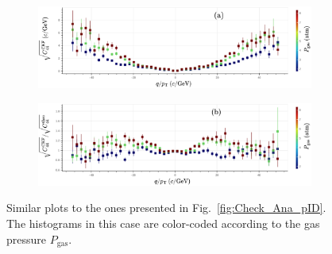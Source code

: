\begin{figure}[!ht]
     \centering
     \begin{subfigure}[b]{0.99\textwidth}
         \centering
         \includegraphics[width=\textwidth]{figures/ch5-KF_NDGAr/ToySample/ParScan/TotVSExpVSdens_noNorm_label.eps}
         \caption{}
         \label{fig:CheckAna_dens_noNorm}
     \end{subfigure}
     \begin{subfigure}[b]{0.99\textwidth}
         \centering
         \includegraphics[width=\textwidth]{figures/ch5-KF_NDGAr/ToySample/ParScan/TotVSExpVSdens_label.eps}
         \caption{}
         \label{fig:CheckAna_dens_Norm}
     \end{subfigure}
        \caption{ Similar plots to the ones presented in Fig.~\ref{fig:Check_Ana_pID}. The histograms in this case are color-coded according to the gas pressure $P_{\textrm{gas}}$.}
        \label{fig:CheckAna_dens}
\end{figure}
